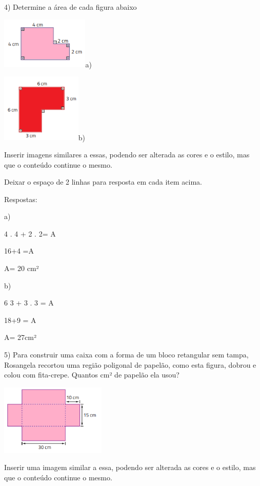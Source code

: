 4) Determine a área de cada figura abaixo

\includegraphics[width=1.65in,height=0.96458in]{./imgSAEB_8_MAT/media/image43.png}a)

\includegraphics[width=1.50833in,height=1.28681in]{./imgSAEB_8_MAT/media/image44.png}b)

Inserir imagens similares a essas, podendo ser alterada as cores e o
estilo, mas que o conteúdo continue o mesmo.

Deixar o espaço de 2 linhas para resposta em cada item acima.

Respostas:

a)

4 . 4 + 2 . 2= A

16+4 =A

A= 20 cm²

b)

\num{6} 3 + 3 . 3 = A

18+9 = A

A= 27cm²

5) Para construir uma caixa com a forma de um bloco retangular sem
tampa, Rosangela recortou uma região poligonal de papelão, como esta
figura, dobrou e colou com fita-crepe. Quantos cm² de papelão ela usou?

\includegraphics[width=1.98333in,height=1.33255in]{./imgSAEB_8_MAT/media/image45.png}

Inserir uma imagem similar a essa, podendo ser alterada as cores e o
estilo, mas que o conteúdo continue o mesmo.

